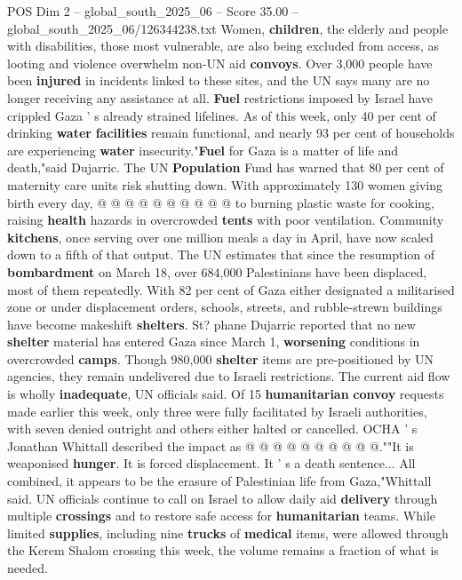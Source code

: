 \begin{textsample}{POS Dim 2 – global\_south\_2025\_06 – Score 35.00 – global\_south\_2025\_06/126344238.txt}
Women, \textbf{children}, the elderly and people with disabilities, those most vulnerable, are also being excluded from access, as looting and violence overwhelm non-UN aid \textbf{convoys}.
Over 3,000 people have been \textbf{injured} in incidents linked to these sites, and the UN says many are no longer receiving any assistance at all. \textbf{Fuel} restrictions imposed by Israel have crippled Gaza ' s already strained lifelines.
As of this week, only 40 per cent of drinking \textbf{water} \textbf{facilities} remain functional, and nearly 93 per cent of households are experiencing \textbf{water} insecurity."\textbf{Fuel} for Gaza is a matter of life and death,"said Dujarric.
The UN \textbf{Population} Fund has warned that 80 per cent of maternity care units risk shutting down.
With approximately 130 women giving birth every day, @ @ @ @ @ @ @ @ @ @ to burning plastic waste for cooking, raising \textbf{health} hazards in overcrowded \textbf{tents} with poor ventilation.
Community \textbf{kitchens}, once serving over one million meals a day in April, have now scaled down to a fifth of that output.
The UN estimates that since the resumption of \textbf{bombardment} on March 18, over 684,000 Palestinians have been displaced, most of them repeatedly.
With 82 per cent of Gaza either designated a militarised zone or under displacement orders, schools, streets, and rubble-strewn buildings have become makeshift \textbf{shelters}.
St? phane Dujarric reported that no new \textbf{shelter} material has entered Gaza since March 1, \textbf{worsening} conditions in overcrowded \textbf{camps}.
Though 980,000 \textbf{shelter} items are pre-positioned by UN agencies, they remain undelivered due to Israeli restrictions.
The current aid flow is wholly \textbf{inadequate}, UN officials said.
Of 15 \textbf{humanitarian} \textbf{convoy} requests made earlier this week, only three were fully facilitated by Israeli authorities, with seven denied outright and others either halted or cancelled.
OCHA ' s Jonathan Whittall described the impact as @ @ @ @ @ @ @ @ @ @.""It is weaponised \textbf{hunger}.
It is forced displacement.
It ' s a death sentence...
All combined, it appears to be the erasure of Palestinian life from Gaza,"Whittall said.
UN officials continue to call on Israel to allow daily aid \textbf{delivery} through multiple \textbf{crossings} and to restore safe access for \textbf{humanitarian} teams.
While limited \textbf{supplies}, including nine \textbf{trucks} of \textbf{medical} items, were allowed through the Kerem Shalom crossing this week, the volume remains a fraction of what is needed.

\end{textsample}
